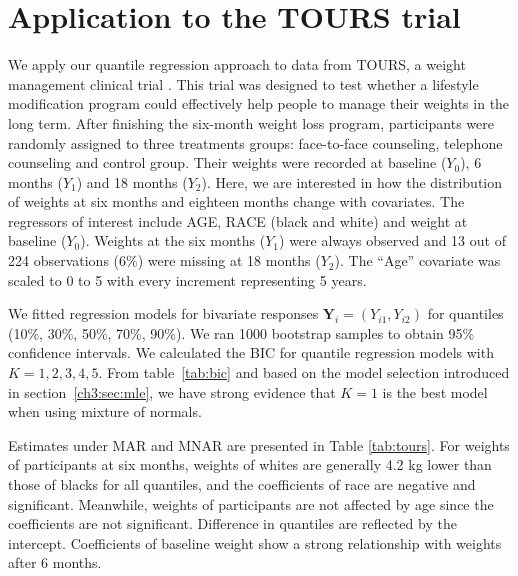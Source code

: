 \documentclass[12pt]{article}
\begin{document}
\section{Application to the TOURS trial}
\label{ch3:sec:real}
We apply our quantile regression approach to data from TOURS, a weight
management clinical trial \citep{perri2008extended}.  This trial was
designed to test whether a lifestyle modification program could
effectively help people to manage their weights in the long
term. After finishing the six-month weight loss program, participants
were randomly assigned to three treatments groups: face-to-face
counseling, telephone counseling and control group. Their weights were
recorded at baseline ($Y_0$), 6 months ($Y_1$) and 18 months
($Y_2$). Here, we are interested in how the distribution of weights at
six months and eighteen months change with covariates. The
regressors of interest include AGE, RACE (black and white) and weight
at baseline ($Y_0$). Weights at the six months ($Y_1$) were always
observed and 13 out of 224 observations (6\%) were missing at 18
months ($Y_2$). The ``Age'' covariate was scaled to 0 to 5 with every
increment representing 5 years.

We fitted regression models for bivariate responses $\bm Y_i =
(Y_{i1}, Y_{i2})$ for quantiles (10\%, 30\%, 50\%, 70\%, 90\%).  We
ran 1000 bootstrap samples to obtain 95\% confidence intervals.
We calculated the BIC for quantile regression models with $K = 1, 2, 3, 4, 5$. From table~\ref{tab:bic} and based on the model selection introduced in section~\ref{ch3:sec:mle}, we have strong evidence that $K = 1$ is the best model when using mixture of normals.

Estimates under MAR and MNAR are presented in Table \ref{tab:tours}.
For weights of participants at six months, weights of whites are generally 4.2 kg lower than those of blacks for all quantiles, and the coefficients of race are negative and significant.
Meanwhile, weights of participants are not affected by age since the coefficients are not significant.
Difference in quantiles are reflected by the intercept.
Coefficients of baseline weight show a strong relationship with weights after 6 months.
\end{document}
